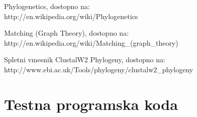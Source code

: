 \documentclass[a4paper, 12pt]{book}
\begin{document}
\begin{thebibliography}{99}
Phylogenetics,
dostopno na:\\ http://en.wikipedia.org/wiki/Phylogenetics

Matching (Graph Theory),
dostopno na: \\ http://en.wikipedia.org/wiki/Matching\_(graph\_theory)

Spletni vmesnik ClustalW2 Phylogeny,
dostopno na: \\ http://www.ebi.ac.uk/Tools/phylogeny/clustalw2\_phylogeny

\end{thebibliography}

\newpage
\appendix
\chapter{Testna programska koda \label{appendix-code-metrics}}
\end{document}
